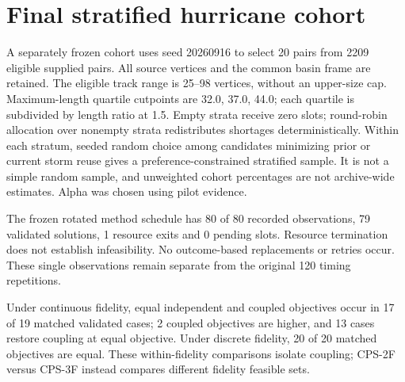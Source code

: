 \section{Final stratified hurricane cohort}\label{sec:final20}
A separately frozen cohort uses seed 20260916 to select 20 pairs from 2209 eligible supplied pairs. All source vertices and the common basin frame are retained. The eligible track range is 25--98 vertices, without an upper-size cap. Maximum-length quartile cutpoints are 32.0, 37.0, 44.0; each quartile is subdivided by length ratio at 1.5. Empty strata receive zero slots; round-robin allocation over nonempty strata redistributes shortages deterministically. Within each stratum, seeded random choice among candidates minimizing prior or current storm reuse gives a preference-constrained stratified sample. It is not a simple random sample, and unweighted cohort percentages are not archive-wide estimates. Alpha was chosen using pilot evidence.

The frozen rotated method schedule has 80 of 80 recorded observations, 79 validated solutions, 1 resource exits and 0 pending slots. Resource termination does not establish infeasibility. No outcome-based replacements or retries occur. These single observations remain separate from the original 120 timing repetitions.



Under continuous fidelity, equal independent and coupled objectives occur in 17 of 19 matched validated cases; 2 coupled objectives are higher, and 13 cases restore coupling at equal objective. Under discrete fidelity, 20 of 20 matched objectives are equal. These within-fidelity comparisons isolate coupling; CPS-2F versus CPS-3F instead compares different fidelity feasible sets.

